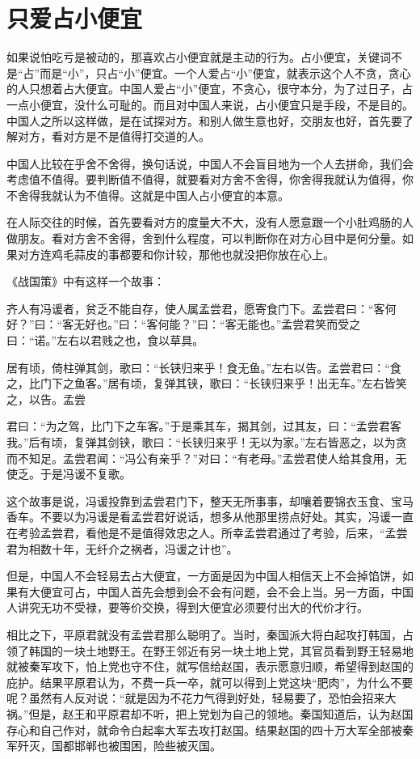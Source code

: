 \documentclass[fontset=fandol, a4paper, 12pt, openright]{ctexbook}
\begin{document}
\section{只爱占小便宜}

如果说怕吃亏是被动的，那喜欢占小便宜就是主动的行为。占小便宜，关键词不是“占”而是“小”，只占“小”便宜。一个人爱占“小”便宜，就表示这个人不贪，贪心的人只想着占大便宜。中国人爱占“小”便宜，不贪心，很守本分，为了过日子，占一点小便宜，没什么可耻的。而且对中国人来说，占小便宜只是手段，不是目的。中国人之所以这样做，是在试探对方。和别人做生意也好，交朋友也好，首先要了解对方，看对方是不是值得打交道的人。

中国人比较在乎舍不舍得，换句话说，中国人不会盲目地为一个人去拼命，我们会考虑值不值得。要判断值不值得，就要看对方舍不舍得，你舍得我就认为值得，你不舍得我就认为不值得。这就是中国人占小便宜的本意。

在人际交往的时候，首先要看对方的度量大不大，没有人愿意跟一个小肚鸡肠的人做朋友。看对方舍不舍得，舍到什么程度，可以判断你在对方心目中是何分量。如果对方连鸡毛蒜皮的事都要和你计较，那他也就没把你放在心上。

《战国策》中有这样一个故事：

齐人有冯谖者，贫乏不能自存，使人属孟尝君，愿寄食门下。孟尝君曰：“客何好？”曰：“客无好也。”曰：“客何能？”曰：“客无能也。”孟尝君笑而受之曰：“诺。”左右以君贱之也，食以草具。

居有顷，倚柱弹其剑，歌曰：“长铗归来乎！食无鱼。”左右以告。孟尝君曰：“食之，比门下之鱼客。”居有顷，复弹其铗，歌曰：“长铗归来乎！出无车。”左右皆笑之，以告。孟尝

君曰：“为之驾，比门下之车客。”于是乘其车，揭其剑，过其友，曰：“孟尝君客我。”后有顷，复弹其剑铗，歌曰：“长铗归来乎！无以为家。”左右皆恶之，以为贪而不知足。孟尝君闻：“冯公有亲乎？”对曰：“有老母。”孟尝君使人给其食用，无使乏。于是冯谖不复歌。

这个故事是说，冯谖投靠到孟尝君门下，整天无所事事，却嚷着要锦衣玉食、宝马香车。不要以为冯谖是看孟尝君好说话，想多从他那里捞点好处。其实，冯谖一直在考验孟尝君，看他是不是值得效忠之人。所幸孟尝君通过了考验，后来，“孟尝君为相数十年，无纤介之祸者，冯谖之计也”。

但是，中国人不会轻易去占大便宜，一方面是因为中国人相信天上不会掉馅饼，如果有大便宜可占，中国人首先会想到会不会有问题，会不会上当。另一方面，中国人讲究无功不受禄，要等价交换，得到大便宜必须要付出大的代价才行。

相比之下，平原君就没有孟尝君那么聪明了。当时，秦国派大将白起攻打韩国，占领了韩国的一块土地野王。在野王邻近有另一块土地上党，其官员看到野王轻易地就被秦军攻下，怕上党也守不住，就写信给赵国，表示愿意归顺，希望得到赵国的庇护。结果平原君认为，不费一兵一卒，就可以得到上党这块“肥肉”，为什么不要呢？虽然有人反对说：“就是因为不花力气得到好处，轻易要了，恐怕会招来大祸。”但是，赵王和平原君却不听，把上党划为自己的领地。秦国知道后，认为赵国存心和自己作对，就命令白起率大军去攻打赵国。结果赵国的四十万大军全部被秦军歼灭，国都邯郸也被围困，险些被灭国。
\end{document}
